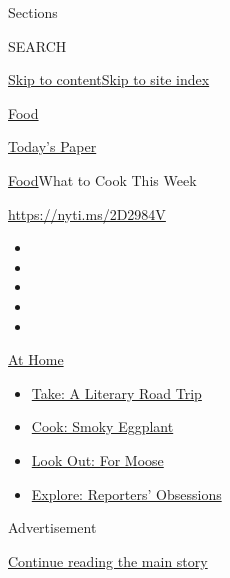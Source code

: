 Sections

SEARCH

\protect\hyperlink{site-content}{Skip to
content}\protect\hyperlink{site-index}{Skip to site index}

\href{https://www.nytimes.com/section/food}{Food}

\href{https://myaccount.nytimes.com/auth/login?response_type=cookie\&client_id=vi}{}

\href{https://www.nytimes.com/section/todayspaper}{Today's Paper}

\href{/section/food}{Food}\textbar{}What to Cook This Week

\url{https://nyti.ms/2D2984V}

\begin{itemize}
\item
\item
\item
\item
\item
\end{itemize}

\href{https://www.nytimes.com/spotlight/at-home?action=click\&pgtype=Article\&state=default\&region=TOP_BANNER\&context=at_home_menu}{At
Home}

\begin{itemize}
\tightlist
\item
  \href{https://www.nytimes.com/2020/07/28/books/time-for-a-literary-road-trip.html?action=click\&pgtype=Article\&state=default\&region=TOP_BANNER\&context=at_home_menu}{Take:
  A Literary Road Trip}
\item
  \href{https://www.nytimes.com/2020/07/29/magazine/bored-with-your-home-cooking-some-smoky-eggplant-will-fix-that.html?action=click\&pgtype=Article\&state=default\&region=TOP_BANNER\&context=at_home_menu}{Cook:
  Smoky Eggplant}
\item
  \href{https://www.nytimes.com/2020/07/27/travel/moose-michigan-isle-royale.html?action=click\&pgtype=Article\&state=default\&region=TOP_BANNER\&context=at_home_menu}{Look
  Out: For Moose}
\item
  \href{https://www.nytimes.com/interactive/2020/at-home/even-more-reporters-editors-diaries-lists-recommendations.html?action=click\&pgtype=Article\&state=default\&region=TOP_BANNER\&context=at_home_menu}{Explore:
  Reporters' Obsessions}
\end{itemize}

Advertisement

\protect\hyperlink{after-top}{Continue reading the main story}

